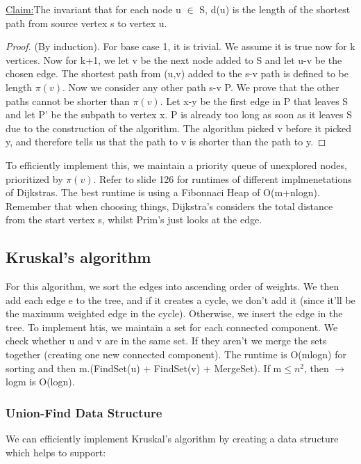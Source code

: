 \documentclass[11pt, oneside]{article}
\theoremstyle{definition}
\newenvironment{claim}[1]{\par\noindent\underline{Claim:}\space#1}{}
\begin{document}
\begin{claim}
  The invariant that for each node u $\in$ S, d(u) is the length of the shortest path from source vertex s to vertex u.
\end{claim}
\begin{proof}
  (By induction). For base case 1, it is trivial. We assume it is true now for k vertices. Now for k+1, we let v be the next node added to S and let u-v be the chosen edge. The shortest path from (u,v) added to the s-v path is defined to be length $\pi(v)$. Now we consider any other path s-v P. We prove that the other paths cannot be shorter than $\pi(v)$. Let x-y be the first edge in P that leaves S and let P' be the subpath to vertex x. P is already too long as soon as it leaves S due to the construction of the algorithm. The algorithm picked v before it picked y, and therefore tells us that the path to v is shorter than the path to y.
\end{proof}

To efficiently implement this, we maintain a priority queue of unexplored nodes, prioritized by $\pi(v)$. Refer to slide 126 for runtimes of different implmenetations of Dijkstras. The best runtime is using a Fibonnaci Heap of O(m+nlogn). Remember that when choosing things, Dijkstra's considers the total distance from the start vertex s, whilst Prim's just looks at the edge.

\subsection{Kruskal's algorithm}
For this algorithm, we sort the edges into ascending order of weights. We then add each edge e to the tree, and if it creates a cycle, we don't add it (since it'll be the maximum weighted edge in the cycle). Otherwise, we insert the edge in the tree. To implement htis, we maintain a set for each connected component. We check whether u and v are in the same set. If they aren't we merge the sets together (creating one new connected component). The runtime is O(mlogn) for sorting and then m.(FindSet(u) + FindSet(v) + MergeSet). If m$\leq n^2$, then $\rightarrow$ logm is O(logn).

\subsubsection{Union-Find Data Structure}
We can efficiently implement Kruskal's algorithm by creating a data structure which helps to support:
\end{document}
